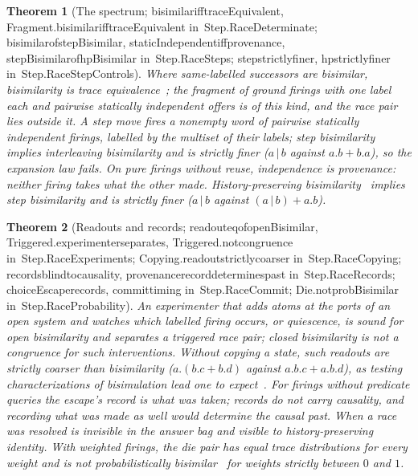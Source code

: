 \documentclass[11pt]{article}
\newtheorem{theorem}{Theorem}
\theoremstyle{remark}
\newcommand{\lean}[1]{{\ttfamily\def\_{\textunderscore\allowbreak}#1}}
\newcommand{\inmod}[1]{in~{\ttfamily\def\_{\textunderscore\allowbreak}#1}}
\begin{document}
\begin{theorem}[The spectrum; \lean{bisimilar\_iff\_traceEquivalent}, \lean{Fragment.bisimilar\_iff\_traceEquivalent} \inmod{Step.RaceDeterminate}; \lean{bisimilar\_of\_stepBisimilar}, \lean{staticIndependent\_iff\_provenance}, \lean{stepBisimilar\_of\_hpBisimilar} \inmod{Step.RaceSteps}; \lean{step\_strictly\_finer}, \lean{hp\_strictly\_finer} \inmod{Step.RaceStepControls}]
Where same-labelled successors are bisimilar, bisimilarity is trace equivalence~\cite{milner89}; the
fragment of ground firings with one label each and pairwise statically independent offers is of this
kind, and the race pair lies outside it. A \emph{step move} fires a nonempty word of pairwise
statically independent firings, labelled by the multiset of their labels; step bisimilarity implies
interleaving bisimilarity and is strictly finer ($a\,|\,b$ against $a.b + b.a$), so the expansion law
fails. On pure firings without reuse, independence is provenance: neither firing takes what the other
made. History-preserving bisimilarity~\cite{vanglabbeekgoltz01} implies step bisimilarity and is
strictly finer ($a\,|\,b$ against $(a\,|\,b) + a.b$).
\end{theorem}

\begin{theorem}[Readouts and records; \lean{readout\_eq\_of\_openBisimilar}, \lean{Triggered.experimenter\_separates}, \lean{Triggered.not\_congruence} \inmod{Step.RaceExperiments}; \lean{Copying.readout\_strictly\_coarser} \inmod{Step.RaceCopying}; \lean{records\_blind\_to\_causality}, \lean{provenance\_record\_determines\_past} \inmod{Step.RaceRecords}; \lean{choiceEscape\_records}, \lean{commit\_timing} \inmod{Step.RaceCommit}; \lean{Die.not\_probBisimilar} \inmod{Step.RaceProbability}]
An experimenter that adds atoms at the ports of an open system and watches which labelled firing
occurs, or quiescence, is sound for open bisimilarity and separates a triggered race pair; closed
bisimilarity is not a congruence for such interventions. Without copying a state, such readouts are
strictly coarser than bisimilarity ($a.(b.c + b.d)$ against $a.b.c + a.b.d$), as testing
characterizations of bisimulation lead one to expect~\cite{abramsky87}. For firings without predicate
queries the escape's record is what was taken; records do not carry causality, and recording what was
made as well would determine the causal past. When a race was resolved is invisible in the answer bag
and visible to history-preserving identity. With weighted firings, the die pair has equal trace
distributions for every weight and is not probabilistically bisimilar~\cite{larsenskou91} for weights
strictly between $0$ and $1$.
\end{theorem}
\end{document}
